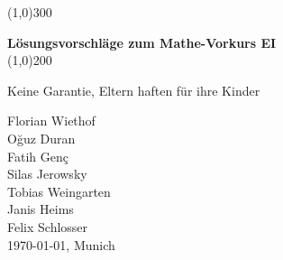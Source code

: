 \begin{titlepage}
	\vspace*{\fill}
	\begin{center}
		\color{gray}\line(1,0){300} \\
		\color{black}
		\vspace{1cm}

		\huge{\bfseries Lösungsvorschläge zum Mathe-Vorkurs EI} \\
		[0.15in]
		\color{gray}\line(1,0){200} \\
		\color{black}

		\vspace{0.5cm}
		\begin{minipage}{8cm}
			\begin{center}
				\large{Keine Garantie, Eltern haften für ihre Kinder}
			\end{center}
		\end{minipage}	
	\end{center}
	\vspace*{\fill}
	\vspace{3cm}
	
	\begin{flushright}
		Florian Wiethof \\
		O\u{g}uz Duran \\
		Fatih Gen\c{c} \\
		Silas Jerowsky \\
		Tobias Weingarten \\
		Janis Heims \\
		Felix Schlosser \\
		\today, Munich
	\end{flushright}
\end{titlepage}



\tableofcontents
{}
\thispagestyle{empty}
\clearpage
\setcounter{page}{1}

